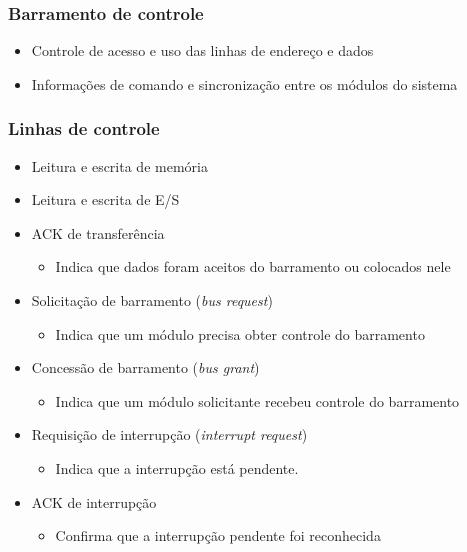 \documentclass[aspectratio=169,
				xcolor=table]{beamer}
\begin{document}
	\begin{frame}
		\frametitle{Barramento de controle}
		\begin{itemize}
			\item Controle de acesso e uso das linhas de endereço e dados
			\vspace{1em}
			\item Informações de comando e sincronização entre os módulos do sistema
		\end{itemize}
	\end{frame}
	
	\begin{frame}[allowframebreaks]
		\frametitle{Linhas de controle}
		\begin{itemize}
			\item Leitura e escrita de memória 
			
			\vspace{1em}
			\item Leitura e escrita de E/S
			\vspace{1em}
			\item ACK de transferência
			\begin{itemize}
				\item Indica que dados foram aceitos do barramento ou colocados nele
			\end{itemize}
			
			\framebreak
			\item Solicitação de barramento (\textit{bus request})
			\begin{itemize}
				\item Indica que um módulo precisa obter controle do barramento
			\end{itemize}
			\vspace{1em}
			\item Concessão de barramento (\textit{bus grant})
			\begin{itemize}
				\item Indica que um módulo solicitante recebeu controle do barramento
			\end{itemize}
			\vspace{1em}
			\item Requisição de interrupção (\textit{interrupt request})
			\begin{itemize}
				\item Indica que a interrupção está pendente.
			\end{itemize}
			\vspace{1em}
			\item ACK de interrupção
			\begin{itemize}
				\item Confirma que a interrupção pendente foi reconhecida
			\end{itemize}
			

\end{itemize}
\end{frame}
\end{document}
